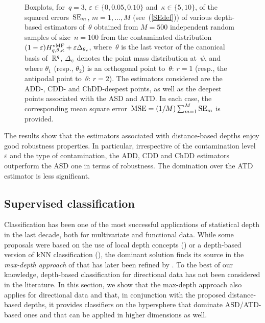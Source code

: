\documentclass[usenames,dvipsnames]{article}
\begin{document}
\begin{figure}[h!]
\captionsetup{font=scriptsize}
\begin{center}  
\end{center}
\vspace{-5mm}
\caption{Boxplots, for~$q=3$, $\varepsilon\in\{0,0.05,0.10\}$ and~$\kappa\in\{5,10\}$, of the squared errors~${\rm SE}_{m}$, $m=1,\ldots,M$ (see~(\ref{SEdef})) of various depth-based estimators of~$\theta$ obtained from $M=500$ independent random samples of size~$n=100$ from the contaminated distribution~$(1-\varepsilon)H^{\rm vMF}_{q,\theta,\kappa}+\varepsilon \Delta_{\theta_r}$, where~$\theta$ is the last vector of the canonical basis of~$\mathbb{R}^q$, $\Delta_{\psi}$ denotes the point mass distribution at~$\psi$, and where $\theta_1$ (resp., $\theta_2$) is an orthogonal point to~$\theta$: $r=1$ (resp., the antipodal point to~$\theta$: $r=2$). The estimators considered are the ADD-, CDD- and ChDD-deepest points, as well as the deepest points associated with the ASD and ATD. In each case, the corresponding mean square error~${\rm MSE} = (1/M) \sum_{m=1}^M {\rm SE}_{m}$ is provided.} 
\label{Robustnessfig}
\end{figure}

The results show that the estimators associated with distance-based depths enjoy good robustness properties. In particular, irrespective of the contamination level~$\varepsilon$ and the type of contamination, the ADD, CDD and ChDD estimators outperform the ASD one in terms of robustness. The domination over the ATD estimator is less significant.


\subsection{Supervised classification}
\label{secSimusub2}

Classification has been one of the most successful applications of statistical depth in the last decade, both for multivariate and functional data. While some proposals were based  on the use of local depth concepts (\citealp{PaiVanB2013}) or a depth-based version of kNN classification (\citealp{PaiVanB2012}), the dominant solution finds its source in the \emph{max-depth approach} of \cite{GhoCha2005B} that has later been refined by \cite{Lietal2012}. To the best of our knowledge, depth-based classification for directional data has not been considered in the literature. In this section, we show that the max-depth approach also applies for directional data and that, in conjunction with the proposed distance-based depths, it provides classifiers on the hypersphere that dominate ASD/ATD-based ones and that can be applied in higher dimensions as well. 
\end{document}

